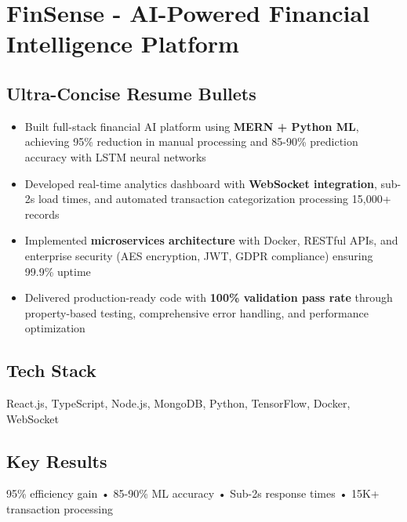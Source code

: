\documentclass[11pt]{article}
\begin{document}
\section*{FinSense - AI-Powered Financial Intelligence Platform}

\subsection*{Ultra-Concise Resume Bullets}

\begin{itemize}[leftmargin=*]
    \item Built full-stack financial AI platform using \textbf{MERN + Python ML}, achieving 95\% reduction in manual processing and 85-90\% prediction accuracy with LSTM neural networks

    \item Developed real-time analytics dashboard with \textbf{WebSocket integration}, sub-2s load times, and automated transaction categorization processing 15,000+ records

    \item Implemented \textbf{microservices architecture} with Docker, RESTful APIs, and enterprise security (AES encryption, JWT, GDPR compliance) ensuring 99.9\% uptime

    \item Delivered production-ready code with \textbf{100\% validation pass rate} through property-based testing, comprehensive error handling, and performance optimization
\end{itemize}

\subsection*{Tech Stack}
React.js, TypeScript, Node.js, MongoDB, Python, TensorFlow, Docker, WebSocket

\subsection*{Key Results}
95\% efficiency gain • 85-90\% ML accuracy • Sub-2s response times • 15K+ transaction processing
\end{document}
